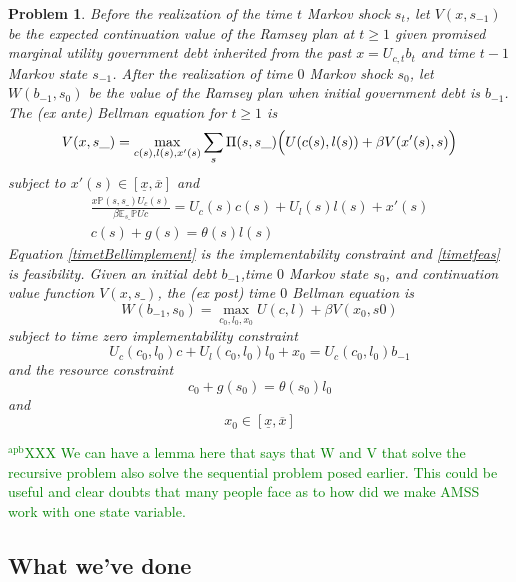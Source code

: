 \documentclass[12pt]{article}
\newcommand{\apb}[1]{\textcolor{green}{$^{\textrm{apb}}${#1}}}
\newcommand{\tjs}[1]{\textcolor{red}{$^{\textrm{tjs}}${#1}}}
\newcommand{\EE}{\mathbb E}
\newtheorem{problem}[theorem]{Problem}
\begin{document}
\begin{problem}\label{prob:RamseyBellman}
Before the realization of the time $t$ Markov shock $s_t$, let   $V(x, s_{-1})$ be the {\em expected} continuation value of the Ramsey plan at $t \geq 1$  given promised marginal utility government debt inherited
from the past $x = U_{c,t} b_t $ and time $t-1$ Markov state $s_{-1}$.
After the realization of time $0$ Markov shock $s_0$, let $W(b_{-1},s_0)$ be the value of the Ramsey plan when initial
government debt is $b_{-1}$. %
The (\textit{ex ante}) Bellman equation for $t\geq1$  is
	\begin{equation}\label{eqn:Bellman1}
		V(x,s\_) = \max_{c(s),l(s),x'(s)} \sum_s \Pi(s,s\_)\Bigl(U(c(s),l(s)) + \beta V(x'(s),s)\Bigr)
	\end{equation}
subject to $x'(s)\in [\underline x,\overline x]$ and
	\begin{align}
		\frac{x \mathbb{P}(s,s\_) U_c(s)}{\beta\EE_{s\_} \mathbb{P}Uc} =U_c(s)c(s)+U_l(s)l(s) + x'(s) \label{timetBellimplement}\\
		c(s) + g(s) = \theta(s)l(s) \label{timetfeas}
	\end{align}
Equation \eqref{timetBellimplement} is the implementability constraint and \eqref{timetfeas} is feasibility.
	Given an initial  debt $b_{-1}$,time $0$ Markov state $s_0$,  and continuation value function $V(x,s\_)$, the (\textit{ex post}) time $0$ Bellman equation is
	\begin{equation}\label{eqn:Bellman0}
		W(b_{-1},s_0) = \max_{c_{0},l_0,x_{0}} U(c,l) +\beta V(x_0,s0)
	\end{equation} subject to  time zero implementability constraint
	\[
		U_{c}(c_0,l_0)c + U_l(c_0,l_0) l_0 + x_0 = U_c(c_0,l_0) b_{-1}
	\]and  the resource constraint
	\[
		c_0+ g(s_0) = \theta(s_0) l_0
	\]and
	\[
		x_0 \in [\underline x,\overline x]
	\]
\end{problem}
\apb{XXX We can have a lemma here that says that W and V that solve the recursive problem also solve the sequential problem posed earlier. This could be useful and clear doubts that many people face as to how did we make AMSS work with one state variable. }

\subsection{What we've done}
\end{document}
